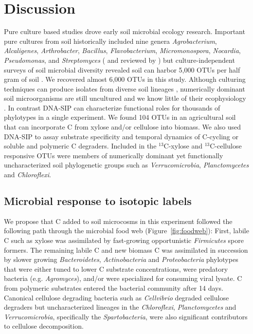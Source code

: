 \section{Discussion}
Pure culture based studies drove early soil microbial ecology research.
Important pure cultures from soil historically included nine genera
\textit{Agrobacterium}, \textit{Alcaligenes}, \textit{Arthrobacter},
\textit{Bacillus}, \textit{Flavobacterium}, \textit{Micromonospora},
\textit{Nocardia}, \textit{Pseudomonas}, and \textit{Streptomyces}
(\citep{Alexander1977} and reviewed by \citet{Janssen2006}) but
culture-independent surveys of soil microbial diversity revealed soil can
harbor 5,000 OTUs per half gram of soil \citep{Schloss2006}. We recovered almost 6,000
OTUs in this study. Although culturing techniques can produce isolates from
diverse soil lineages \citep{Janssen2002}, numerically dominant soil
microorganisms are still uncultured and we know little of their ecophysiology
\citep{Janssen2006}. In contrast DNA-SIP can characterize functional roles for
thousands of phylotypes in a single experiment. We found 104 OTUs in an
agricultural soil that can incorporate C from xylose and/or cellulose into
biomass. We also used DNA-SIP to assay substrate specificity
and temporal dynamics of C-cycling or soluble and polymeric C degraders.
Included in the $^{13}$C-xylose and $^{13}$C-cellulose responsive OTUs were
members of numerically dominant yet functionally uncharacterized soil
phylogenetic groups such as \textit{Verrucomicrobia}, \textit{Planctomycetes}
and \textit{Chloroflexi}.

\subsection{Microbial response to isotopic labels}
We propose that C added to soil microcosms in this experiment followed the
following path through the microbial food web (Figure~\ref{fig:foodweb}):
First, labile C such as xylose was assimilated by fast-growing opportunistic
\textit{Firmicutes} spore formers. The remaining labile C and new biomass C was
assimilated in succession by slower growing \textit{Bacteroidetes},
\textit{Actinobacteria} and \textit{Proteobacteria} phylotypes that were either
tuned to lower C substrate concentrations, were predatory bacteria (e.g.
\textit{Agromyces}), and/or were specialized for consuming viral lysate.
C from polymeric substrates entered the bacterial community after 14 days.
Canonical cellulose degrading bacteria such as \textit{Cellvibrio} degraded
cellulose degraders but uncharacterized lineages in the \textit{Chloroflexi},
\textit{Planctomycetes} and \textit{Verrucomicrobia}, specifically the
\textit{Spartobacteria}, were also significant contributors to cellulose
decomposition. 

